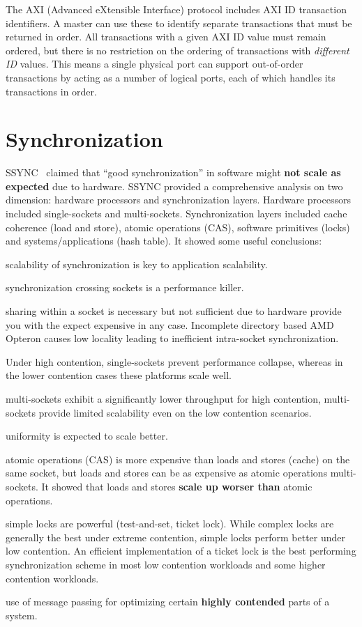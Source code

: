 \documentclass[UTF8,12pt,a4paper]{article}
\begin{document}
The AXI (Advanced eXtensible Interface) protocol
includes AXI ID transaction identifiers.
A master can use these to identify separate transactions that must be returned in order.
All transactions with a given AXI ID value must remain ordered,
but there is no restriction on the ordering of transactions with \textit{different ID} values.
This means a single physical port can support out-of-order transactions
by acting as a number of logical ports,
each of which handles its transactions in order.

\clearpage

\section{Synchronization}
SSYNC~\cite{DBLP:conf/sosp/DavidGT13} claimed that
``good synchronization'' in software might \textbf{not scale as expected} due to hardware.
SSYNC provided a comprehensive analysis on two dimension:
hardware processors and synchronization layers.
Hardware processors included single-sockets and multi-sockets.
Synchronization layers included cache coherence (load and store),
atomic operations (CAS), software primitives (locks)
and systems/applications (hash table).
It showed some useful conclusions:
\begin{compactitem}
  \item scalability of synchronization is key to application scalability.
  \item synchronization crossing sockets is a performance killer.
  \item sharing within a socket is necessary but not sufficient
  due to hardware provide you with the expect expensive in any case.
  Incomplete directory based AMD Opteron causes low locality
  leading to inefficient intra-socket synchronization.
  \item Under high contention, single-sockets prevent performance collapse,
  whereas in the lower contention cases these platforms scale well.
  \item multi-sockets exhibit a significantly lower throughput for high contention,
  multi-sockets provide limited scalability even on the low contention scenarios.
  \item uniformity is expected to scale better.
  \item atomic operations (CAS) is more expensive than loads and stores (cache) on the same socket,
  but loads and stores can be as expensive as atomic operations multi-sockets.
  It showed that loads and stores \textbf{scale up worser than} atomic operations.
  \item simple locks are powerful (test-and-set, ticket lock).
  While complex locks are generally the best under extreme contention,
  simple locks perform better under low contention.
  An efficient implementation of a ticket lock is the best performing synchronization scheme
  in most low contention workloads and some higher contention workloads.
  \item use of message passing for optimizing certain \textbf{highly contended} parts of a system.
\end{compactitem}
\end{document}
